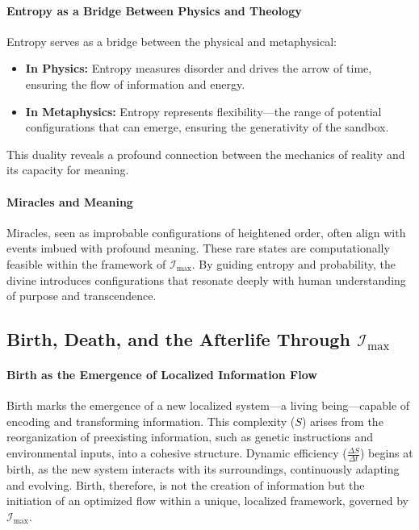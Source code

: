 \documentclass[12pt]{article}
\begin{document}
\paragraph{Entropy as a Bridge Between Physics and Theology}
Entropy serves as a bridge between the physical and metaphysical:
\begin{itemize}
    \item \textbf{In Physics:} Entropy measures disorder and drives the arrow of time, ensuring the flow of information and energy.
    \item \textbf{In Metaphysics:} Entropy represents flexibility—the range of potential configurations that can emerge, ensuring the generativity of the sandbox.
\end{itemize}
This duality reveals a profound connection between the mechanics of reality and its capacity for meaning.

\paragraph{Miracles and Meaning}
Miracles, seen as improbable configurations of heightened order, often align with events imbued with profound meaning. These rare states are computationally feasible within the framework of \(\mathcal{I}_{\text{max}}\). By guiding entropy and probability, the divine introduces configurations that resonate deeply with human understanding of purpose and transcendence.

\subsection{Birth, Death, and the Afterlife Through \(\mathcal{I}_{\text{max}}\)}

\paragraph{Birth as the Emergence of Localized Information Flow}
Birth marks the emergence of a new localized system—a living being—capable of encoding and transforming information. This complexity (\(S\)) arises from the reorganization of preexisting information, such as genetic instructions and environmental inputs, into a cohesive structure. Dynamic efficiency (\(\frac{\Delta S}{\Delta t}\)) begins at birth, as the new system interacts with its surroundings, continuously adapting and evolving. Birth, therefore, is not the creation of information but the initiation of an optimized flow within a unique, localized framework, governed by \(\mathcal{I}_{\text{max}}\).
\end{document}
